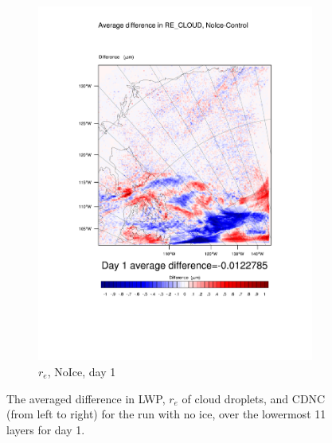 \begin{figure}[hb]
\begin{subfigure}{0.30\textwidth}
		\includegraphics[width=\textwidth]{results/noice/diff_NoIce_RE_CLOUD_Day1.pdf}
		\caption{$r_e$, NoIce, day 1}
		\label{subfig:recloud_r2Day1}
	\end{subfigure}
\caption{The averaged difference in LWP, $r_e$ of cloud droplets, and CDNC (from left to right) for the run with no ice, over the lowermost 11 layers for day 1.}
\label{fig:lwpcdncre_r2Day1}
\end{figure}
